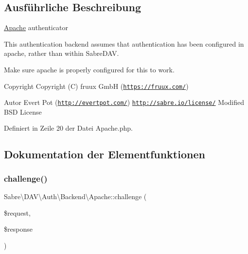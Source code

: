 \subsection{Ausführliche Beschreibung}
\mbox{\hyperlink{class_sabre_1_1_d_a_v_1_1_auth_1_1_backend_1_1_apache}{Apache}} authenticator

This authentication backend assumes that authentication has been configured in apache, rather than within Sabre\+D\+AV.

Make sure apache is properly configured for this to work.

\begin{DoxyCopyright}{Copyright}
Copyright (C) fruux GmbH (\href{https://fruux.com/}{\tt https\+://fruux.\+com/}) 
\end{DoxyCopyright}
\begin{DoxyAuthor}{Autor}
Evert Pot (\href{http://evertpot.com/}{\tt http\+://evertpot.\+com/})  \href{http://sabre.io/license/}{\tt http\+://sabre.\+io/license/} Modified B\+SD License 
\end{DoxyAuthor}


Definiert in Zeile 20 der Datei Apache.\+php.



\subsection{Dokumentation der Elementfunktionen}
\mbox{\label{class_sabre_1_1_d_a_v_1_1_auth_1_1_backend_1_1_apache_ab15a45837c02291e2a941136af47aa02}} 
\subsubsection{\texorpdfstring{challenge()}{challenge()}}
{\footnotesize\ttfamily Sabre\textbackslash{}\+D\+A\+V\textbackslash{}\+Auth\textbackslash{}\+Backend\textbackslash{}\+Apache\+::challenge (\begin{DoxyParamCaption}\item[{\mbox{\hyperlink{interface_sabre_1_1_h_t_t_p_1_1_request_interface}{Request\+Interface}}}]{\$request,  }\item[{\mbox{\hyperlink{interface_sabre_1_1_h_t_t_p_1_1_response_interface}{Response\+Interface}}}]{\$response }\end{DoxyParamCaption})}

